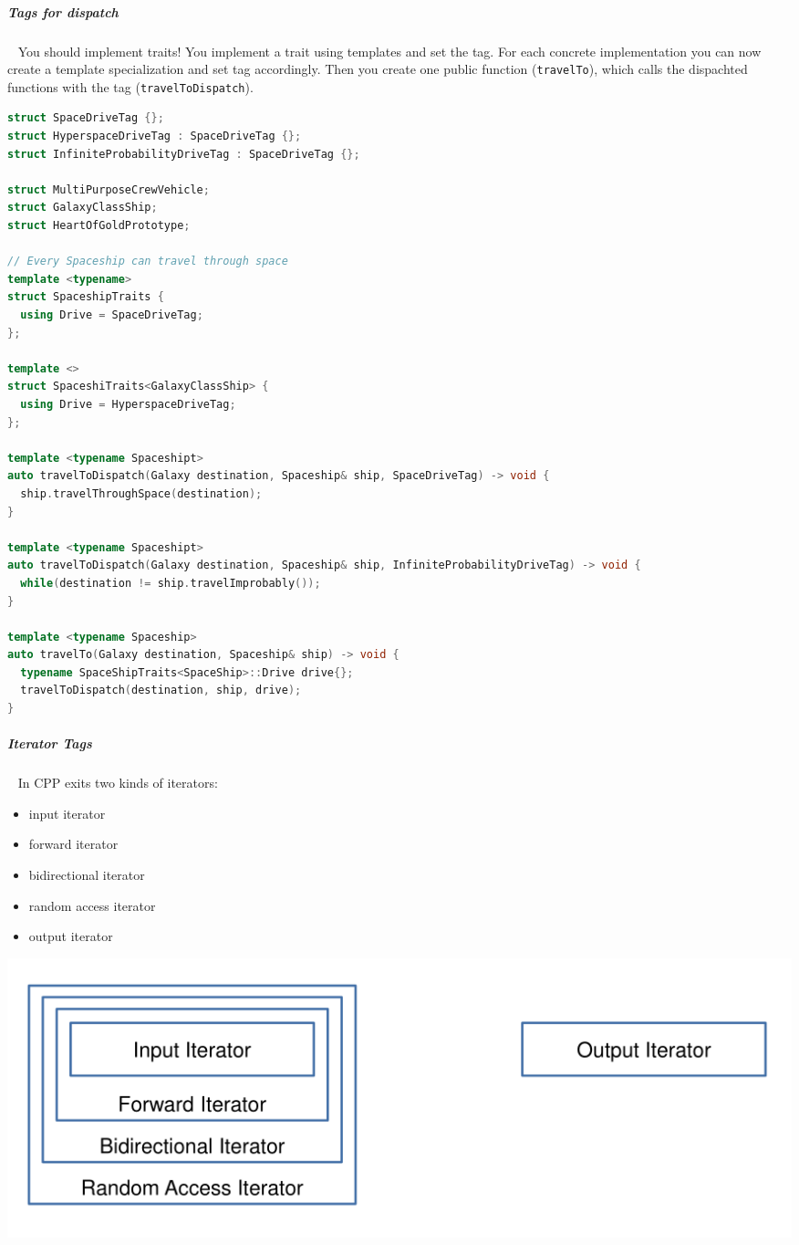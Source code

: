 \documentclass[11pt,twoside,landscape]{article}
\begin{document}
\begin{multicols}{2}
\subparagraph{Tags for dispatch} \
\label{sec:orgcbb8692}
You should implement traits!
You implement a trait using templates and set the tag.
For each concrete implementation you can now create a template specialization and set tag accordingly.
Then you create one public function (\texttt{travelTo}), which calls the dispachted functions with the tag (\texttt{travelToDispatch}).

\begin{lstlisting}[language=c++,label=lst:tag-for-dispatching-example,caption={Tag for dispatching example},captionpos=b,numbers=none]
struct SpaceDriveTag {};
struct HyperspaceDriveTag : SpaceDriveTag {};
struct InfiniteProbabilityDriveTag : SpaceDriveTag {};

struct MultiPurposeCrewVehicle;
struct GalaxyClassShip;
struct HeartOfGoldPrototype;

// Every Spaceship can travel through space
template <typename>
struct SpaceshipTraits {
  using Drive = SpaceDriveTag;
};

template <>
struct SpaceshiTraits<GalaxyClassShip> {
  using Drive = HyperspaceDriveTag;
};

template <typename Spaceshipt>
auto travelToDispatch(Galaxy destination, Spaceship& ship, SpaceDriveTag) -> void {
  ship.travelThroughSpace(destination);
}

template <typename Spaceshipt>
auto travelToDispatch(Galaxy destination, Spaceship& ship, InfiniteProbabilityDriveTag) -> void {
  while(destination != ship.travelImprobably());
}

template <typename Spaceship>
auto travelTo(Galaxy destination, Spaceship& ship) -> void {
  typename SpaceShipTraits<SpaceShip>::Drive drive{};
  travelToDispatch(destination, ship, drive);
}
\end{lstlisting}

\subparagraph{Iterator Tags} \
\label{sec:org38daff8}
In CPP exits two kinds of iterators:
\begin{itemize}
\item input iterator
\item forward iterator
\item bidirectional iterator
\item random access iterator
\item output iterator
\end{itemize}


{
\begin{center}
\includegraphics[width=.9\linewidth]{img/stl_iterator_categories.png}
\end{center}
\captionof{figure}{STL Iterator Categories}\label{fig:stl-iterator-categories}
}


\end{multicols}
\end{document}
